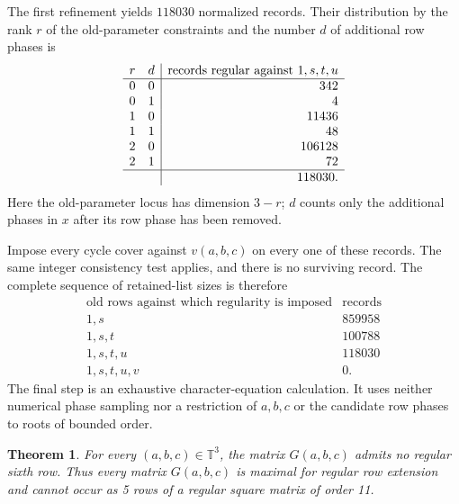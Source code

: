 \documentclass[11pt,a4paper]{article}
\newtheorem{theorem}{Theorem}[section]
\theoremstyle{plain}
\theoremstyle{definition}
\theoremstyle{plain}
\begin{document}
The first refinement yields $118030$ normalized records. Their distribution by the rank $r$ of the old-parameter constraints and the number $d$ of additional row phases is
\[
\begin{array}{cc|r}
r&d&\text{records regular against }1,s,t,u\\\hline
0&0&342\\
0&1&4\\
1&0&11436\\
1&1&48\\
2&0&106128\\
2&1&72\\\hline
&&118030.
\end{array}
\]
Here the old-parameter locus has dimension $3-r$; $d$ counts only the additional phases in $x$ after its row phase has been removed. 

Impose every cycle cover against $v(a,b,c)$ on every one of these records. The same integer consistency test applies, and there is no surviving record. The complete sequence of retained-list sizes is therefore
\[
\begin{array}{l|r}
\text{old rows against which regularity is imposed}&\text{records}\\\hline
1,s&859958\\
1,s,t&100788\\
1,s,t,u&118030\\
1,s,t,u,v&0.
\end{array}
\]
The final step is an exhaustive character-equation calculation. It uses neither numerical phase sampling nor a restriction of $a,b,c$ or the candidate row phases to roots of bounded order.

\par\addvspace{\medskipamount}\noindent
\begin{minipage}{\linewidth}
\begin{theorem}\label{n11_positive:main}
For every $(a,b,c)\in\mathbb T^3$, the matrix $G(a,b,c)$ admits no regular sixth row. Thus every matrix $G(a,b,c)$ is maximal for regular row extension and cannot occur as 5 rows of a regular square matrix of order 11.
\end{theorem}
\end{minipage}
\par\addvspace{\medskipamount}
\end{document}
